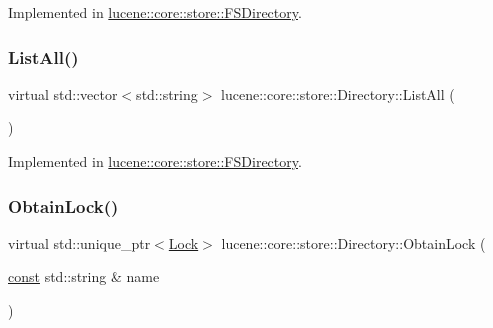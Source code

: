 Implemented in \mbox{\hyperlink{classlucene_1_1core_1_1store_1_1FSDirectory_a4e681691f8abcb8606a5b90fbd90f934}{lucene\+::core\+::store\+::\+F\+S\+Directory}}.

\mbox{\label{classlucene_1_1core_1_1store_1_1Directory_ac89cd351d7dc2a1e16763ae2a1984518}} 
\subsubsection{\texorpdfstring{List\+All()}{ListAll()}}
{\footnotesize\ttfamily virtual std\+::vector$<$std\+::string$>$ lucene\+::core\+::store\+::\+Directory\+::\+List\+All (\begin{DoxyParamCaption}{ }\end{DoxyParamCaption})\hspace{0.3cm}{\ttfamily [pure virtual]}}



Implemented in \mbox{\hyperlink{classlucene_1_1core_1_1store_1_1FSDirectory_a9295fa6067a5329703ae95e349088bc0}{lucene\+::core\+::store\+::\+F\+S\+Directory}}.

\mbox{\label{classlucene_1_1core_1_1store_1_1Directory_afe0348fa3979da64289fbd4c96db5845}} 
\subsubsection{\texorpdfstring{Obtain\+Lock()}{ObtainLock()}}
{\footnotesize\ttfamily virtual std\+::unique\+\_\+ptr$<$\mbox{\hyperlink{classlucene_1_1core_1_1store_1_1Lock}{Lock}}$>$ lucene\+::core\+::store\+::\+Directory\+::\+Obtain\+Lock (\begin{DoxyParamCaption}\item[{\mbox{\hyperlink{ZlibCrc32_8h_a2c212835823e3c54a8ab6d95c652660e}{const}} std\+::string \&}]{name }\end{DoxyParamCaption})\hspace{0.3cm}{\ttfamily [pure virtual]}}



